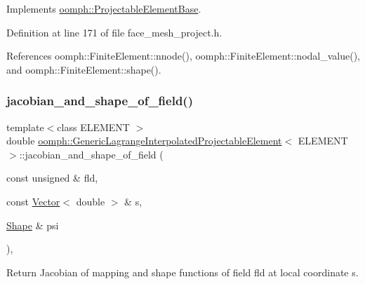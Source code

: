 Implements \hyperlink{classoomph_1_1ProjectableElementBase_ae4da5b565b6d333be2f5920f7be763cd}{oomph\+::\+Projectable\+Element\+Base}.



Definition at line 171 of file face\+\_\+mesh\+\_\+project.\+h.



References oomph\+::\+Finite\+Element\+::nnode(), oomph\+::\+Finite\+Element\+::nodal\+\_\+value(), and oomph\+::\+Finite\+Element\+::shape().

\mbox{\label{classoomph_1_1GenericLagrangeInterpolatedProjectableElement_ac9e67d23b865eb118acbca2eea74c8a3}} 
\subsubsection{\texorpdfstring{jacobian\+\_\+and\+\_\+shape\+\_\+of\+\_\+field()}{jacobian\_and\_shape\_of\_field()}}
{\footnotesize\ttfamily template$<$class E\+L\+E\+M\+E\+NT $>$ \\
double \hyperlink{classoomph_1_1GenericLagrangeInterpolatedProjectableElement}{oomph\+::\+Generic\+Lagrange\+Interpolated\+Projectable\+Element}$<$ E\+L\+E\+M\+E\+NT $>$\+::jacobian\+\_\+and\+\_\+shape\+\_\+of\+\_\+field (\begin{DoxyParamCaption}\item[{const unsigned \&}]{fld,  }\item[{const \hyperlink{classoomph_1_1Vector}{Vector}$<$ double $>$ \&}]{s,  }\item[{\hyperlink{classoomph_1_1Shape}{Shape} \&}]{psi }\end{DoxyParamCaption})\hspace{0.3cm}{\ttfamily [inline]}, {\ttfamily [virtual]}}



Return Jacobian of mapping and shape functions of field fld at local coordinate s. 



